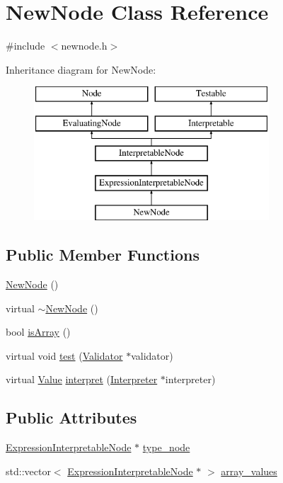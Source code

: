 \hypertarget{classNewNode}{}\section{New\+Node Class Reference}
\label{classNewNode}


{\ttfamily \#include $<$newnode.\+h$>$}

Inheritance diagram for New\+Node\+:\begin{figure}[H]
\begin{center}
\leavevmode
\includegraphics[height=5.000000cm]{classNewNode}
\end{center}
\end{figure}
\subsection*{Public Member Functions}
\begin{DoxyCompactItemize}
\item 
\hyperlink{classNewNode_a55edf2127f3cd875164a199029d7ebba}{New\+Node} ()
\item 
virtual \hyperlink{classNewNode_ab06c72bb48fc65bb12a21c1a6c3aa9c8}{$\sim$\+New\+Node} ()
\item 
bool \hyperlink{classNewNode_af2d1614a80b8fcc00957155109e4b2f2}{is\+Array} ()
\item 
virtual void \hyperlink{classNewNode_a9be504d069e8a5d4ea13b4767a3c792a}{test} (\hyperlink{classValidator}{Validator} $\ast$validator)
\item 
virtual \hyperlink{classValue}{Value} \hyperlink{classNewNode_a77447b9402f0153401bf0e623b5f1e6e}{interpret} (\hyperlink{classInterpreter}{Interpreter} $\ast$interpreter)
\end{DoxyCompactItemize}
\subsection*{Public Attributes}
\begin{DoxyCompactItemize}
\item 
\hyperlink{classExpressionInterpretableNode}{Expression\+Interpretable\+Node} $\ast$ \hyperlink{classNewNode_a1cf62395c1531a22ca8e1932ed82910c}{type\+\_\+node}
\item 
std\+::vector$<$ \hyperlink{classExpressionInterpretableNode}{Expression\+Interpretable\+Node} $\ast$ $>$ \hyperlink{classNewNode_afd78e7c3e05eb57a1536f705fb900fd5}{array\+\_\+values}
\end{DoxyCompactItemize}
